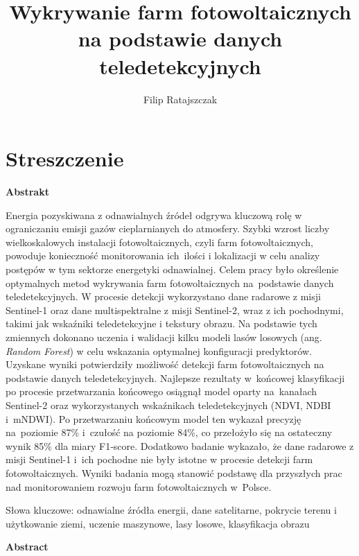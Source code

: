 \documentclass{amuthesis}
\author{Filip Ratajszczak}
\title{Wykrywanie farm fotowoltaicznych na podstawie danych
teledetekcyjnych}
\begin{document}

\titlepage


\hypertarget{streszczenie}{%
\chapter*{Streszczenie}\label{streszczenie}}


\textbf{Abstrakt}

Energia pozyskiwana z odnawialnych źródeł odgrywa kluczową rolę w
ograniczaniu emisji gazów cieplarnianych do atmosfery. Szybki wzrost
liczby wielkoskalowych instalacji fotowoltaicznych, czyli farm
fotowoltaicznych, powoduje konieczność monitorowania ich~ilości i
lokalizacji w celu analizy postępów w tym sektorze energetyki
odnawialnej. Celem pracy było określenie optymalnych metod wykrywania
farm fotowoltaicznych na~podstawie danych teledetekcyjnych. W procesie
detekcji wykorzystano dane radarowe z misji Sentinel-1 oraz dane
multispektralne z misji Sentinel-2, wraz z ich pochodnymi, takimi jak
wskaźniki teledetekcyjne i tekstury obrazu. Na podstawie tych zmiennych
dokonano uczenia i walidacji kilku modeli lasów losowych (ang.
\emph{Random Forest}) w celu wskazania optymalnej konfiguracji
predyktorów. Uzyskane wyniki potwierdziły możliwość detekcji farm
fotowoltaicznych na podstawie danych teledetekcyjnych. Najlepsze
rezultaty w~końcowej klasyfikacji po procesie przetwarzania końcowego
osiągnął model oparty na~kanałach Sentinel-2 oraz wykorzystanych
wskaźnikach teledetekcyjnych (NDVI, NDBI i~mNDWI). Po przetwarzaniu
końcowym model ten wykazał precyzję na~poziomie 87\% i~czułość na
poziomie 84\%, co przełożyło się na ostateczny wynik 85\% dla miary
F1‑score. Dodatkowo badanie wykazało, że dane radarowe z misji
Sentinel-1 i~ich pochodne nie były istotne w procesie detekcji farm
fotowoltaicznych. Wyniki badania mogą stanowić podstawę dla przyszłych
prac nad monitorowaniem rozwoju farm fotowoltaicznych w~Polsce.

Słowa kluczowe: odnawialne źródła energii, dane satelitarne, pokrycie
terenu i użytkowanie ziemi, uczenie maszynowe, lasy losowe, klasyfikacja
obrazu

\newpage

\textbf{Abstract}
\end{document}
